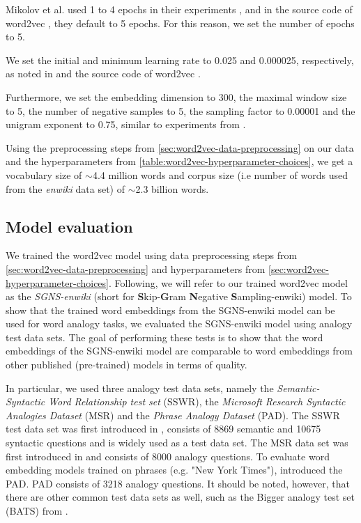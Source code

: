 Mikolov et al. used 1 to 4 epochs in their experiments \cite{mikolov2013a, mikolov2013b}, and in the source code of word2vec \cite[line 43]{Word2vecCCode}, they default to 5 epochs. For this reason, we set the number of epochs to 5.

We set the initial and minimum learning rate to 0.025 and 0.000025, respectively, as noted in \cite{mikolov2013a} and the source code of word2vec \cite[lines 44 and 398]{Word2vecCCode}.

Furthermore, we set the embedding dimension to 300, the maximal window size to 5, the number of negative samples to 5, the sampling factor to 0.00001 and the unigram exponent to 0.75, similar to experiments from \cite{mikolov2013b}.

Using the preprocessing steps from \cref{sec:word2vec-data-preprocessing} on our data and the hyperparameters from \cref{table:word2vec-hyperparameter-choices}, we get a vocabulary size of $\sim$4.4 million words and corpus size (i.e number of words used from the \textit{enwiki} data set) of $\sim$2.3 billion words.

\subsection{Model evaluation}
\label{sec:word2vec-model-evaluation}
We trained the word2vec model using data preprocessing steps from \cref{sec:word2vec-data-preprocessing} and hyperparameters from \cref{sec:word2vec-hyperparameter-choices}. Following, we will refer to our trained word2vec model as the \textit{SGNS-enwiki} (short for \textbf{S}kip-\textbf{G}ram \textbf{N}egative \textbf{S}ampling-enwiki) model. To show that the trained word embeddings from the SGNS-enwiki model can be used for word analogy tasks, we evaluated the SGNS-enwiki model using analogy test data sets. The goal of performing these tests is to show that the word embeddings of the SGNS-enwiki model are comparable to word embeddings from other published (pre-trained) models in terms of quality.

In particular, we used three analogy test data sets, namely the \textit{Semantic-Syntactic Word Relationship test set} (SSWR), the \textit{Microsoft Research Syntactic Analogies Dataset} (MSR) and the \textit{Phrase Analogy Dataset} (PAD). The SSWR test data set was first introduced in \cite{mikolov2013a}, consists of 8869 semantic and 10675 syntactic questions and is widely used as a test data set. The MSR data set was first introduced in \cite{mikolov-etal-2013-linguistic} and consists of 8000 analogy questions. To evaluate word embedding models trained on phrases (e.g. "New York Times"), \cite{mikolov2013b} introduced the PAD. PAD consists of 3218 analogy questions. It should be noted, however, that there are other common test data sets as well, such as the Bigger analogy test set (BATS) from \cite{gladkova-etal-2016-analogy}.

